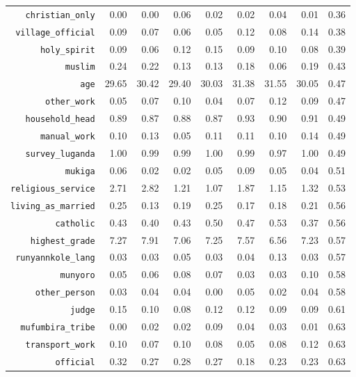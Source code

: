 \begin{longtable}{rrrrrrrrr}
  {\texttt{christian\_only}} & 0.00 & 0.00 & 0.06 & 0.02 & 0.02 & 0.04 & 0.01 & 0.36 \\ 
  {\texttt{village\_official}} & 0.09 & 0.07 & 0.06 & 0.05 & 0.12 & 0.08 & 0.14 & 0.38 \\ 
  {\texttt{holy\_spirit}} & 0.09 & 0.06 & 0.12 & 0.15 & 0.09 & 0.10 & 0.08 & 0.39 \\ 
  {\texttt{muslim}} & 0.24 & 0.22 & 0.13 & 0.13 & 0.18 & 0.06 & 0.19 & 0.43 \\ 
  {\texttt{age}} & 29.65 & 30.42 & 29.40 & 30.03 & 31.38 & 31.55 & 30.05 & 0.47 \\ 
  {\texttt{other\_work}} & 0.05 & 0.07 & 0.10 & 0.04 & 0.07 & 0.12 & 0.09 & 0.47 \\ 
  {\texttt{household\_head}} & 0.89 & 0.87 & 0.88 & 0.87 & 0.93 & 0.90 & 0.91 & 0.49 \\ 
  {\texttt{manual\_work}} & 0.10 & 0.13 & 0.05 & 0.11 & 0.11 & 0.10 & 0.14 & 0.49 \\ 
  {\texttt{survey\_luganda}} & 1.00 & 0.99 & 0.99 & 1.00 & 0.99 & 0.97 & 1.00 & 0.49 \\ 
  {\texttt{mukiga}} & 0.06 & 0.02 & 0.02 & 0.05 & 0.09 & 0.05 & 0.04 & 0.51 \\ 
  {\texttt{religious\_service}} & 2.71 & 2.82 & 1.21 & 1.07 & 1.87 & 1.15 & 1.32 & 0.53 \\ 
  {\texttt{living\_as\_married}} & 0.25 & 0.13 & 0.19 & 0.25 & 0.17 & 0.18 & 0.21 & 0.56 \\ 
  {\texttt{catholic}} & 0.43 & 0.40 & 0.43 & 0.50 & 0.47 & 0.53 & 0.37 & 0.56 \\ 
  {\texttt{highest\_grade}} & 7.27 & 7.91 & 7.06 & 7.25 & 7.57 & 6.56 & 7.23 & 0.57 \\ 
  {\texttt{runyannkole\_lang}} & 0.03 & 0.03 & 0.05 & 0.03 & 0.04 & 0.13 & 0.03 & 0.57 \\ 
  {\texttt{munyoro}} & 0.05 & 0.06 & 0.08 & 0.07 & 0.03 & 0.03 & 0.10 & 0.58 \\ 
  {\texttt{other\_person}} & 0.03 & 0.04 & 0.04 & 0.00 & 0.05 & 0.02 & 0.04 & 0.58 \\ 
  {\texttt{judge}} & 0.15 & 0.10 & 0.08 & 0.12 & 0.12 & 0.09 & 0.09 & 0.61 \\ 
  {\texttt{mufumbira\_tribe}} & 0.00 & 0.02 & 0.02 & 0.09 & 0.04 & 0.03 & 0.01 & 0.63 \\ 
  {\texttt{transport\_work}} & 0.10 & 0.07 & 0.10 & 0.08 & 0.05 & 0.08 & 0.12 & 0.63 \\ 
  {\texttt{official}} & 0.32 & 0.27 & 0.28 & 0.27 & 0.18 & 0.23 & 0.23 & 0.63 \\ 

\end{longtable}
